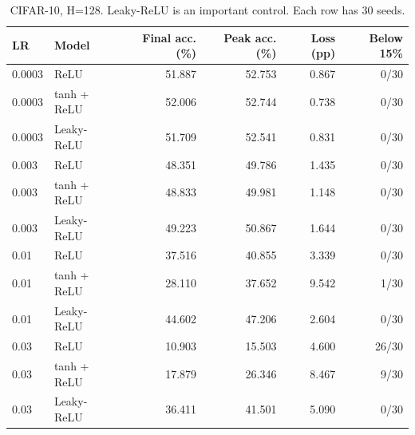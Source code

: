 \begin{table}[htbp]
\centering
\caption{CIFAR-10, H=128. Leaky-ReLU is an important control. Each row has 30 seeds.}
\label{tab:cifarstress}
\small
\begin{tabular}{@{}llrrrr@{}}
\toprule
LR & Model & Final acc. (\%) & Peak acc. (\%) & Loss (pp) & Below 15\% \\
\midrule
0.0003 & ReLU & 51.887 & 52.753 & 0.867 & 0/30 \\
0.0003 & tanh + ReLU & 52.006 & 52.744 & 0.738 & 0/30 \\
0.0003 & Leaky-ReLU & 51.709 & 52.541 & 0.831 & 0/30 \\
0.003 & ReLU & 48.351 & 49.786 & 1.435 & 0/30 \\
0.003 & tanh + ReLU & 48.833 & 49.981 & 1.148 & 0/30 \\
0.003 & Leaky-ReLU & 49.223 & 50.867 & 1.644 & 0/30 \\
0.01 & ReLU & 37.516 & 40.855 & 3.339 & 0/30 \\
0.01 & tanh + ReLU & 28.110 & 37.652 & 9.542 & 1/30 \\
0.01 & Leaky-ReLU & 44.602 & 47.206 & 2.604 & 0/30 \\
0.03 & ReLU & 10.903 & 15.503 & 4.600 & 26/30 \\
0.03 & tanh + ReLU & 17.879 & 26.346 & 8.467 & 9/30 \\
0.03 & Leaky-ReLU & 36.411 & 41.501 & 5.090 & 0/30 \\
\bottomrule
\end{tabular}
\end{table}
